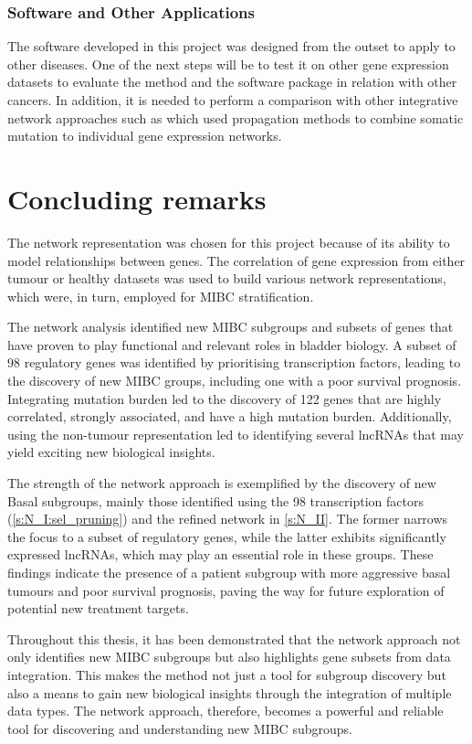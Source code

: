\subsubsection*{Software and Other Applications}

The software developed in this project was designed from the outset to apply to other diseases. One of the next steps will be to test it on other gene expression datasets to evaluate the method and the software package in relation with other cancers. In addition, it is needed to perform a comparison with other integrative network approaches such as \citet{Hofree2013-ld,He2017-dj} which used propagation methods to combine somatic mutation to individual gene expression networks.


\section{Concluding remarks}

The network representation was chosen for this project because of its ability to model relationships between genes. The correlation of gene expression from either tumour or healthy datasets was used to build various network representations, which were, in turn, employed for MIBC stratification.


The network analysis identified new MIBC subgroups and subsets of genes that have proven to play functional and relevant roles in bladder biology. A subset of 98 regulatory genes was identified by prioritising transcription factors, leading to the discovery of new MIBC groups, including one with a poor survival prognosis. Integrating mutation burden led to the discovery of 122 genes that are highly correlated, strongly associated, and have a high mutation burden. Additionally, using the non-tumour representation led to identifying several lncRNAs that may yield exciting new biological insights.

% 
The strength of the network approach is exemplified by the discovery of new Basal subgroups, mainly those identified using the 98 transcription factors (\cref{s:N_I:sel_pruning}) and the refined network in \cref{s:N_II}. The former narrows the focus to a subset of regulatory genes, while the latter exhibits significantly expressed lncRNAs, which may play an essential role in these groups. These findings indicate the presence of a patient subgroup with more aggressive basal tumours and poor survival prognosis, paving the way for future exploration of potential new treatment targets.

Throughout this thesis, it has been demonstrated that the network approach not only identifies new MIBC subgroups but also highlights gene subsets from data integration. This makes the method not just a tool for subgroup discovery but also a means to gain new biological insights through the integration of multiple data types. The network approach, therefore, becomes a powerful and reliable tool for discovering and understanding new MIBC subgroups.